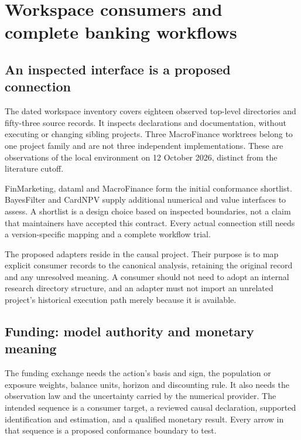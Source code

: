 

\chapter{Workspace consumers and complete banking workflows}
\label{in:consumers}

\section{An inspected interface is a proposed connection}

The dated workspace inventory covers eighteen observed top-level directories
and fifty-three source records. It inspects declarations and documentation,
without executing or changing sibling projects. Three MacroFinance worktrees
belong to one project family and are not three independent implementations.
These are observations of the local environment on 12 October 2026, distinct
from the literature cutoff.\cite{v12_in_inventory}

FinMarketing, dataml and MacroFinance form the initial conformance shortlist.
BayesFilter and CardNPV supply additional numerical and value interfaces to
assess. A shortlist is a design choice based on inspected boundaries, not a
claim that maintainers have accepted this contract. Every actual connection
still needs a version-specific mapping and a complete workflow trial.

The proposed adapters reside in the causal project. Their purpose is to map
explicit consumer records to the canonical analysis, retaining the original
record and any unresolved meaning. A consumer should not need to adopt an
internal research directory structure, and an adapter must not import an
unrelated project's historical execution path merely because it is available.

\section{Funding: model authority and monetary meaning}

The funding exchange needs the action's basis and sign, the population or
exposure weights, balance units, horizon and discounting rule. It also needs
the observation law and the uncertainty carried by the numerical provider.
The intended sequence is a consumer target, a reviewed causal declaration,
supported identification and estimation, and a qualified monetary result.
Every arrow in that sequence is a proposed conformance boundary to test.

